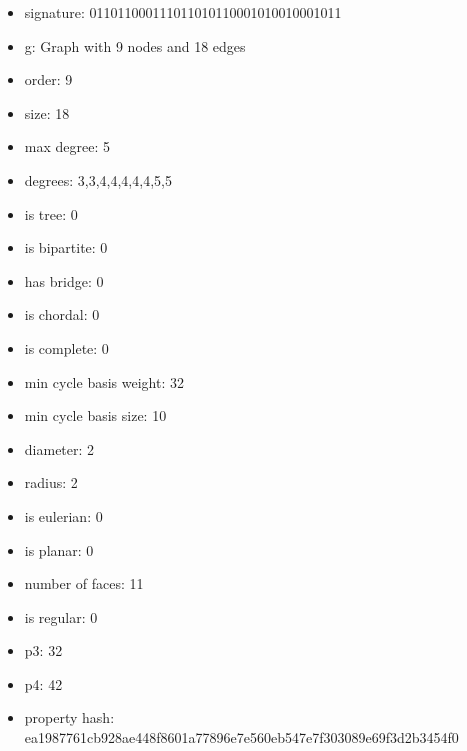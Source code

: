 \newpage
\begin{figure}
\end{figure}
\begin{itemize}
\item signature: 011011000111011010110001010010001011
\item g: Graph with 9 nodes and 18 edges
\item order: 9
\item size: 18
\item max degree: 5
\item degrees: 3,3,4,4,4,4,4,5,5
\item is tree: 0
\item is bipartite: 0
\item has bridge: 0
\item is chordal: 0
\item is complete: 0
\item min cycle basis weight: 32
\item min cycle basis size: 10
\item diameter: 2
\item radius: 2
\item is eulerian: 0
\item is planar: 0
\item number of faces: 11
\item is regular: 0
\item p3: 32
\item p4: 42
\item property hash: ea1987761cb928ae448f8601a77896e7e560eb547e7f303089e69f3d2b3454f0
\end{itemize}
